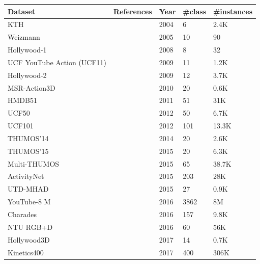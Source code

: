\begin{table}
    \centering
    \begin{tabular}{|l|l|l|l|l|}
        \hline
        \textbf{Dataset} & \textbf{References} & \textbf{Year} & \textbf{\#class} & \textbf{\#instances} \\ \hline
        KTH & \textcite{dataset:schuldt_kth_2004} & 2004 & 6 & 2.4K \\ \hline
        Weizmann & \textcite{dataset:blank_weizmann_2005} & 2005 & 10 & 90 \\ \hline
        Hollywood-1 & \textcite{dataset:laptev_hollywood_2008} & 2008 & 8 & 32 \\ \hline
        UCF YouTube Action (UCF11) & \textcite{dataset:liu_ucf11_2009} & 2009 & 11 & 1.2K \\ \hline
        Hollywood-2 & \textcite{dataset:marszalek_hollywood2_2009} & 2009 & 12 & 3.7K \\ \hline
        MSR-Action3D & \textcite{dataset:li_msr3d_2010} & 2010 & 20 & 0.6K \\ \hline
        HMDB51 & \textcite{dataset:HMDB51} & 2011 & 51 & 31K \\ \hline
        UCF50 & \textcite{dataset:reddy_recognizing_2013} & 2012 & 50 & 6.7K \\ \hline
        UCF101 & \textcite{dataset:UCF101} & 2012 & 101 & 13.3K \\ \hline
        THUMOS’14 & \textcite{dataset:thumos} & 2014 & 20 & 2.6K \\ \hline
        THUMOS’15 & \textcite{dataset:thumos} & 2015 & 20 & 6.3K \\ \hline
        Multi-THUMOS & \textcite{dataset:yeung_multithumos_2017} & 2015 & 65 & 38.7K \\ \hline
        ActivityNet & \textcite{dataset:activitynet} & 2015 & 203 & 28K \\ \hline
        UTD-MHAD & \textcite{dataset:chen_utdmhad_2015} & 2015 & 27 & 0.9K \\ \hline
        YouTube-8 M & \textcite{dataset:abu_youtube8m_2016} & 2016 & 3862 & 8M \\ \hline
        Charades & \textcite{dataset:sigurdsson_charades_2016} & 2016 & 157 & 9.8K \\ \hline
        NTU RGB+D & \textcite{dataset:shahroudy_ntu_2016} & 2016 & 60 & 56K \\ \hline
        Hollywood3D & \textcite{dataset:hadfield_hollywood3_2017} & 2017 & 14 & 0.7K \\ \hline
        Kinetics400 & \textcite{dataset:kinetics} & 2017 & 400 & 306K \\ \hline

\end{tabular}
\end{table}
